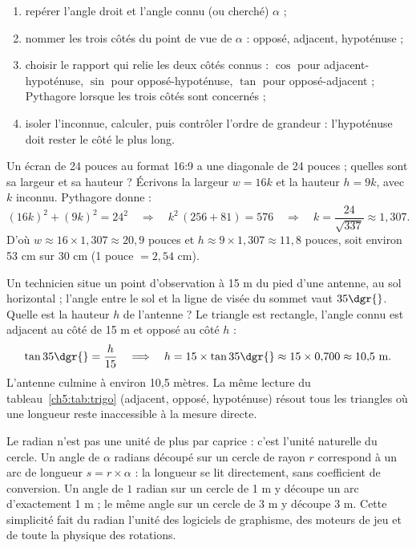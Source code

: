 \begin{methode}
\begin{enumerate}
  \item repérer l'angle droit et l'angle connu (ou cherché) $\alpha$ ;
  \item nommer les trois côtés du point de vue de $\alpha$ : opposé, adjacent, hypoténuse ;
  \item choisir le rapport qui relie les deux côtés connus : $\cos$ pour adjacent-hypoténuse, $\sin$ pour opposé-hypoténuse, $\tan$ pour opposé-adjacent ; Pythagore lorsque les trois côtés sont concernés ;
  \item isoler l'inconnue, calculer, puis contrôler l'ordre de grandeur : l'hypoténuse doit rester le côté le plus long.
\end{enumerate}
\end{methode}

\begin{exemple}
Un écran de 24 pouces au format 16:9 a une diagonale de 24 pouces ; quelles sont sa largeur et sa hauteur ? Écrivons la largeur $w = 16k$ et la hauteur $h = 9k$, avec $k$ inconnu. Pythagore donne :
\[
(16k)^{2} + (9k)^{2} = 24^{2}
\quad\Longrightarrow\quad
k^{2}\,(256 + 81) = 576
\quad\Longrightarrow\quad
k = \frac{24}{\sqrt{337}} \approx 1{,}307 .
\]
D'où $w \approx 16 \times 1{,}307 \approx 20{,}9$ pouces et $h \approx 9 \times 1{,}307 \approx 11{,}8$ pouces, soit environ 53 cm sur 30 cm (1 pouce $= 2{,}54$ cm).
\end{exemple}

\begin{exemple}
Un technicien situe un point d'observation à 15 m du pied d'une antenne, au sol horizontal ; l'angle entre le sol et la ligne de visée du sommet vaut $35\dgr{}$. Quelle est la hauteur $h$ de l'antenne ? Le triangle est rectangle, l'angle connu est adjacent au côté de 15 m et opposé au côté $h$ :
\[
\tan 35\dgr{} = \frac{h}{15}
\quad\Longrightarrow\quad
h = 15 \times \tan 35\dgr{} \approx 15 \times 0{,}700 \approx 10{,}5\ \text{m} .
\]
L'antenne culmine à environ 10,5 mètres. La même lecture du tableau~\ref{ch5:tab:trigo} (adjacent, opposé, hypoténuse) résout tous les triangles où une longueur reste inaccessible à la mesure directe.
\end{exemple}

\begin{remarque}
Le radian n'est pas une unité de plus par caprice : c'est l'unité naturelle du cercle. Un angle de $\alpha$ radians découpé sur un cercle de rayon $r$ correspond à un arc de longueur $s = r \times \alpha$ : la longueur se lit directement, sans coefficient de conversion. Un angle de $1$ radian sur un cercle de 1 m y découpe un arc d'exactement 1 m ; le même angle sur un cercle de 3 m y découpe 3 m. Cette simplicité fait du radian l'unité des logiciels de graphisme, des moteurs de jeu et de toute la physique des rotations.
\end{remarque}

